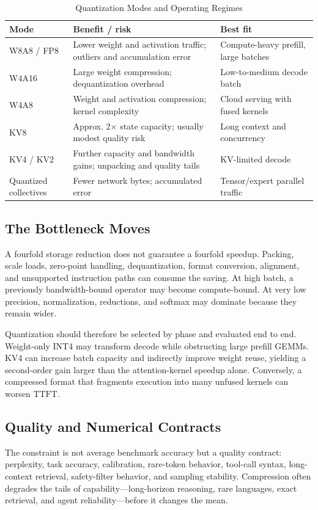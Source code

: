 \documentclass[journal]{IEEEtran}
\newcommand{\TTFT}{\ensuremath{\mathrm{TTFT}}}
\begin{document}
\begin{table}[t]
\caption{Quantization Modes and Operating Regimes}
\label{tab:quant}
\centering
\scriptsize
\begin{tabularx}{\columnwidth}{@{}p{}p{}X@{}}
\toprule
Mode & Benefit / risk & Best fit \\
\midrule
W8A8 / FP8 & Lower weight and activation traffic; outliers and accumulation error & Compute-heavy prefill, large batches \\
W4A16 & Large weight compression; dequantization overhead & Low-to-medium decode batch \\
W4A8 & Weight and activation compression; kernel complexity & Cloud serving with fused kernels \\
KV8 & Approx. 2$\times$ state capacity; usually modest quality risk & Long context and concurrency \\
KV4 / KV2 & Further capacity and bandwidth gains; unpacking and quality tails & KV-limited decode \\
Quantized collectives & Fewer network bytes; accumulated error & Tensor/expert parallel traffic \\
\bottomrule
\end{tabularx}
\end{table}

\subsection{The Bottleneck Moves}
A fourfold storage reduction does not guarantee a fourfold speedup. Packing, scale loads, zero-point handling, dequantization, format conversion, alignment, and unsupported instruction paths can consume the saving. At high batch, a previously bandwidth-bound operator may become compute-bound. At very low precision, normalization, reductions, and softmax may dominate because they remain wider.

Quantization should therefore be selected by phase and evaluated end to end. Weight-only INT4 may transform decode while obstructing large prefill GEMMs. KV4 can increase batch capacity and indirectly improve weight reuse, yielding a second-order gain larger than the attention-kernel speedup alone. Conversely, a compressed format that fragments execution into many unfused kernels can worsen \TTFT.

\subsection{Quality and Numerical Contracts}
The constraint is not average benchmark accuracy but a quality contract: perplexity, task accuracy, calibration, rare-token behavior, tool-call syntax, long-context retrieval, safety-filter behavior, and sampling stability. Compression often degrades the tails of capability---long-horizon reasoning, rare languages, exact retrieval, and agent reliability---before it changes the mean.
\end{document}
